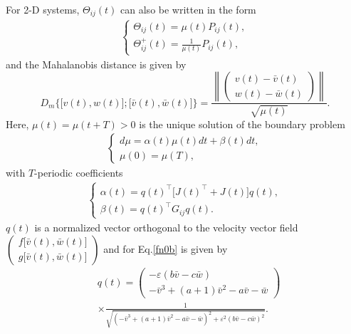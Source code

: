 For 2-D systems, $\Theta_{ij}(t)$  can also
be written in the form \cite{Bashkirtseva2}
\begin{equation}\label{fn63b}
\begin{split}
\left\{\begin{array}{lcl}
\Theta_{ij}(t)=\mu(t)P_{ij}(t),\\
\Theta_{ij}^{+}(t)=\frac{1}{\mu(t)}P_{ij}(t),
\end{array}\right.
\end{split}
\end{equation}
and the Mahalanobis distance is given by 
\begin{equation}\label{fn63c}
 D_m\Big\{\big[v(t),w(t)\big];\big[\bar{v}(t),\bar{w}(t)\big]\Big\}=
 \frac{\left\lVert\left(\begin{array}{c}
 v(t)-\bar{v}(t)\\w(t)-\bar{w}(t)
\end{array}\right)\right\rVert}{\sqrt{\mu(t)}}.
\end{equation}
Here, $\mu(t)=\mu(t+T)>0$ is the unique solution of the boundary problem
\begin{equation}\label{fn64}
\begin{split}
\left\{\begin{array}{lcl}
d\mu=\alpha(t)\mu(t)dt+\beta(t)dt,\\
\mu(0)=\mu(T),
\end{array}\right.
\end{split}
\end{equation}
with $T$-periodic coefficients
\begin{equation}\label{fn64a}
\begin{split}
\left\{\begin{array}{lcl}
\alpha(t)=q(t)^\top\big[J(t)^\top + J(t)\big]q(t),\\
\beta(t)=q(t)^\top G_{ij}q(t).
\end{array}\right.
\end{split}
\end{equation}
$q(t)$ is a normalized vector orthogonal to the velocity vector field 
$\left( \begin{array}{c} f\big[\bar{v}(t),\bar{w}(t)\big] \\
g\big[\bar{v}(t),\bar{w}(t)\big]  \end{array} \right)$ and for
Eq.\eqref{fn0b} is given by
\begin{align}\label{fn65}\nonumber
&q(t)=\left(\begin{array}{c}-\varepsilon(b\bar{v}-c\bar{w})\\
-\bar{v}^3+(a+1)\bar{v}^2-a\bar{v}-\bar{w} \end{array} \right)\\
&\times\frac{1}{\sqrt{(-\bar{v}^3+(a+1)\bar{v}^2-a\bar{v}-\bar{w})^2
+\varepsilon^2(b\bar{v}-c\bar{w})^2}}.
\end{align}
